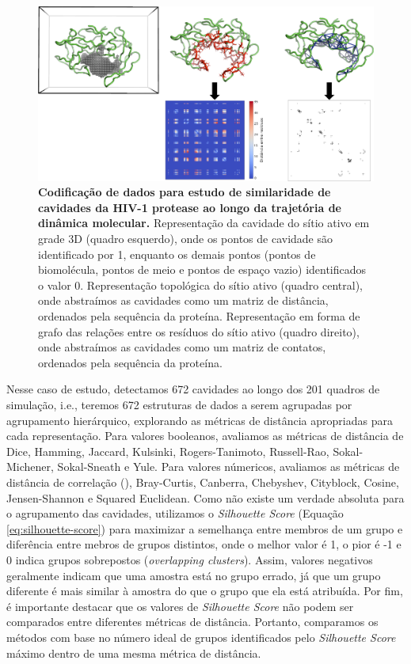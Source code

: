 \documentclass[Portugues]{phdquali}
\def\ie{i.e.\onedot}
\begin{document}
\begin{figure}[h]
  \centering
  \includegraphics[scale=1]{images/HIV-1-representation.png}
  \caption[Codificação de dados para estudo de similaridade de cavidades da HIV-1 protease ao longo da trajetória de dinâmica molecular]{\textbf{Codificação de dados para estudo de similaridade de cavidades da HIV-1 protease ao longo da trajetória de dinâmica molecular.} Representação da cavidade do sítio ativo em grade 3D (quadro esquerdo), onde os pontos de cavidade são identificado por 1, enquanto os demais pontos (pontos de biomolécula, pontos de meio e pontos de espaço vazio) identificados o valor 0. Representação topológica do sítio ativo (quadro central), onde abstraímos as cavidades como um matriz de distância, ordenados pela sequência da proteína. Representação em forma de grafo das relações entre os resíduos do sítio ativo (quadro direito), onde abstraímos as cavidades como um matriz de contatos, ordenados pela sequência da proteína.}
  \label{fig:hiv-1-representation}
\end{figure}

Nesse caso de estudo, detectamos 672 cavidades ao longo dos 201 quadros de simulação, \ie, teremos 672 estruturas de dados a serem agrupadas por agrupamento hierárquico, explorando as métricas de distância apropriadas para cada representação. Para valores booleanos, avaliamos as métricas de distância de Dice, Hamming, Jaccard, Kulsinki, Rogers-Tanimoto, Russell-Rao, Sokal-Michener, Sokal-Sneath e Yule. Para valores númericos, avaliamos as métricas de distância de correlação (\textrho), Bray-Curtis, Canberra, Chebyshev, Cityblock, Cosine, Jensen-Shannon e Squared Euclidean. Como não existe um verdade absoluta para o agrupamento das cavidades, utilizamos o \textit{Silhouette Score} (Equação \ref{eq:silhouette-score}) para maximizar a semelhança entre membros de um grupo e diferência entre mebros de grupos distintos, onde o melhor valor é 1, o pior é -1 e 0 indica grupos sobrepostos (\textit{overlapping clusters}). Assim, valores negativos geralmente indicam que uma amostra está no grupo errado, já que um grupo diferente é mais similar à amostra do que o grupo que ela está atribuída. Por fim, é importante destacar que os valores de \textit{Silhouette Score} não podem ser comparados entre diferentes métricas de distância. Portanto, comparamos os métodos com base no número ideal de grupos identificados pelo \textit{Silhouette Score} máximo dentro de uma mesma métrica de distância.
\end{document}
